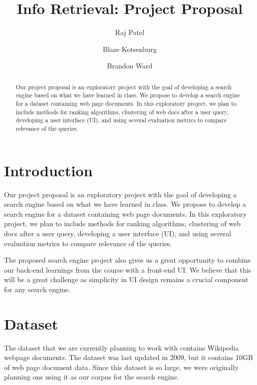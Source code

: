 \documentclass[sigconf]{acmart}
\begin{document}
\title{Info Retrieval: Project Proposal}

\author{Raj Patel}

\author{Blaze Kotsenburg}

\author{Brandon Ward}

\begin{abstract}
Our project proposal is an exploratory project with the goal of developing a search engine based on what we have learned in class. We propose to develop a search engine for a dataset containing web page documents. In this exploratory project, we plan to include methods for ranking algorithms, clustering of web docs after a user query, developing a user interface (UI), and using several evaluation metrics to compare relevance of the queries.
\end{abstract}


\maketitle

\section{Introduction}
Our project proposal is an exploratory project with the goal of developing a search engine based on what we have learned in class. We propose to develop a search engine for a dataset containing web page documents. In this exploratory project, we plan to include methods for ranking algorithms, clustering of web docs after a user query, developing a user interface (UI), and using several evaluation metrics to compare relevance of the queries.

The proposed search engine project also gives us a great opportunity to combine our back-end learnings from the course with a front-end UI. We believe that this will be a great challenge as simplicity in UI design remains a crucial component for any search engine.

\section{Dataset}
The dataset that we are currently planning to work with contains Wikipedia webpage documents. The dataset was last updated in 2009, but it contains 10GB of web page document data. Since this dataset is so large, we were originally planning ons using it as our corpus for the search engine.
\end{document}
